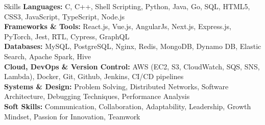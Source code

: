 \documentclass{resume} %
\begin{document}
\vspace{-5pt}
\begin{rSection}{Skills}
   \small \textbf{Languages:} C, C++, Shell Scripting, Python, Java, Go, SQL, HTML5, CSS3, JavaScript, TypeScript, Node.js \\
   \small \textbf{Frameworks \& Tools:} React.js, Vue.js, AngularJs, Next.js, Express.js, PyTorch, Jest, RTL, Cypress, GraphQL  \\
   \small \textbf{Databases:} MySQL, PostgreSQL, Nginx, Redis, MongoDB, Dynamo DB, Elastic Search, Apache Spark, Hive \\
   \small \textbf{Cloud, DevOps \& Version Control:} AWS (EC2, S3, CloudWatch, SQS, SNS, Lambda), Docker, Git, Github, Jenkins, CI/CD pipelines\\
   \small \textbf{Systems \& Design:} Problem Solving, Distributed Networks, Software Architecture, Debugging Techniques, Performance Analysis \\
   \small \textbf{Soft Skills:} Communication, Collaboration, Adaptability, Leadership, Growth Mindset, Passion for Innovation, Teamwork  \\
\end{rSection}

\end{document}
